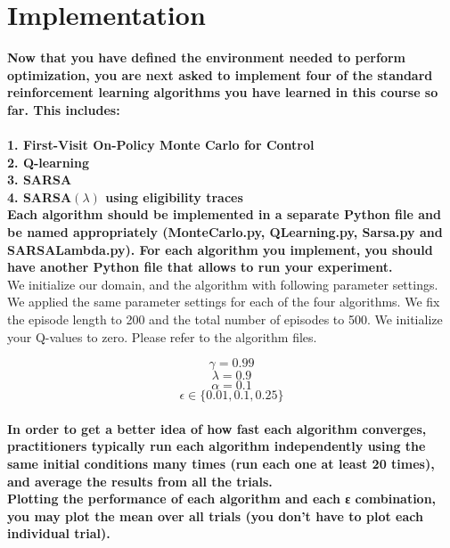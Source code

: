 \documentclass[11pt]{article}
\begin{document}
\section{Implementation}
\textbf{Now that you have defined the environment needed to perform
optimization, you are next asked to implement four of the standard reinforcement
learning algorithms you have learned in this course so far. This includes:}\\

\\
\indent\textbf{1. First-Visit On-Policy Monte Carlo for Control}
\\
\indent\textbf{2. Q-learning}
\\
\indent\textbf{3. SARSA}
\\
\indent\textbf{4. SARSA$(\lambda)$ using eligibility traces}
\\

\noindent
\textbf{Each algorithm should be implemented in a separate Python file and be
named appropriately (MonteCarlo.py, QLearning.py, Sarsa.py and SARSALambda.py).
For each algorithm you implement, you should have another Python file that
allows to run your experiment.} \\

\noindent
We initialize our domain, and the algorithm with following parameter settings. We applied the same parameter settings for each of the four algorithms. We fix the episode length to 200 and the total number of episodes to 500.  We initialize your Q-values to zero. Please refer to the algorithm files.

\begin{equation}
\gamma = 0.99
\end{equation}
\begin{equation}
\lambda = 0.9
\end{equation}
\begin{equation}
\alpha = 0.1
\end{equation}
\begin{equation}
\epsilon \in\{0.01,0.1,0.25\}
\end{equation}\\

\noindent
\textbf{In order to get a better idea of how fast each algorithm converges,
practitioners typically run each algorithm independently using the same initial
conditions many times (run each one at least 20 times), and average the results
from all the trials.} \\

\noindent
\textbf{Plotting the performance of each algorithm and each ε combination, you
may plot the mean over all trials (you don’t have to plot each individual
trial).} \\
\end{document}
